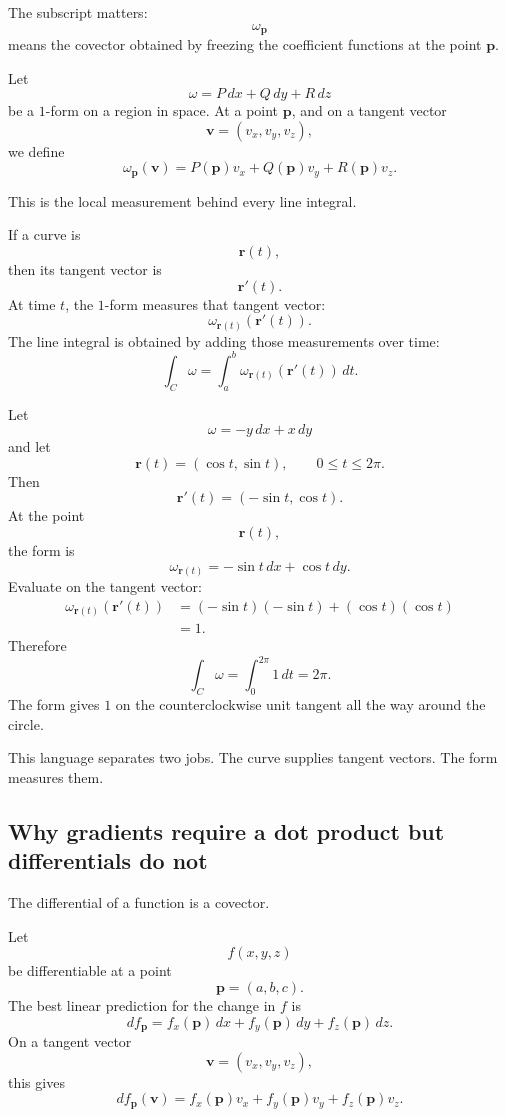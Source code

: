The subscript matters:
\[
    \omega_{\mathbf p}
\]
means the covector obtained by freezing the coefficient functions at the point
\(\mathbf p\).

\begin{definition}
Let
\[
    \omega=P\,dx+Q\,dy+R\,dz
\]
be a \(1\)-form on a region in space.  At a point \(\mathbf p\), and on a tangent vector
\[
    \mathbf v=(v_x,v_y,v_z),
\]
we define
\[
\boxed{
    \omega_{\mathbf p}(\mathbf v)
    =
    P(\mathbf p)v_x+Q(\mathbf p)v_y+R(\mathbf p)v_z.
}
\]
\end{definition}

This is the local measurement behind every line integral.

If a curve is
\[
    \mathbf r(t),
\]
then its tangent vector is
\[
    \mathbf r'(t).
\]
At time \(t\), the \(1\)-form measures that tangent vector:
\[
    \omega_{\mathbf r(t)}(\mathbf r'(t)).
\]
The line integral is obtained by adding those measurements over time:
\[
\boxed{
    \int_C \omega
    =
    \int_a^b
    \omega_{\mathbf r(t)}(\mathbf r'(t))\,dt.
}
\]

\begin{example}
Let
\[
    \omega=-y\,dx+x\,dy
\]
and let
\[
    \mathbf r(t)=(\cos t,\sin t),
    \qquad
    0\le t\le2\pi.
\]
Then
\[
    \mathbf r'(t)=(-\sin t,\cos t).
\]
At the point
\[
    \mathbf r(t),
\]
the form is
\[
    \omega_{\mathbf r(t)}
    =
    -\sin t\,dx+\cos t\,dy.
\]
Evaluate on the tangent vector:
\[
\begin{aligned}
    \omega_{\mathbf r(t)}(\mathbf r'(t))
    &=
    (-\sin t)(-\sin t)+(\cos t)(\cos t)\\
    &=
    1.
\end{aligned}
\]
Therefore
\[
    \int_C \omega
    =
    \int_0^{2\pi}1\,dt
    =
    2\pi.
\]
The form gives \(1\) on the counterclockwise unit tangent all the way around the circle.
\end{example}

This language separates two jobs.  The curve supplies tangent vectors.  The form
measures them.

\subsection{Why gradients require a dot product but differentials do not}

The differential of a function is a covector.

Let
\[
    f(x,y,z)
\]
be differentiable at a point
\[
    \mathbf p=(a,b,c).
\]
The best linear prediction for the change in \(f\) is
\[
    df_{\mathbf p}
    =
    f_x(\mathbf p)\,dx
    +
    f_y(\mathbf p)\,dy
    +
    f_z(\mathbf p)\,dz.
\]
On a tangent vector
\[
    \mathbf v=(v_x,v_y,v_z),
\]
this gives
\[
\boxed{
    df_{\mathbf p}(\mathbf v)
    =
    f_x(\mathbf p)v_x
    +
    f_y(\mathbf p)v_y
    +
    f_z(\mathbf p)v_z.
}
\]

